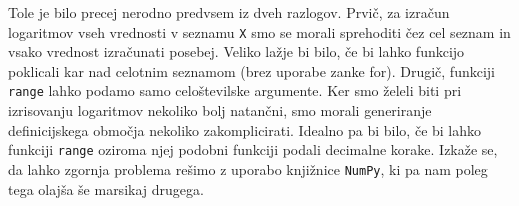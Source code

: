 Tole je bilo precej nerodno predvsem iz dveh razlogov. Prvič, za izračun logaritmov vseh vrednosti v seznamu \texttt{X} smo se morali sprehoditi čez cel seznam in vsako vrednost izračunati posebej. Veliko lažje bi bilo, če bi lahko funkcijo poklicali kar nad celotnim seznamom (brez uporabe zanke for). Drugič, funkciji \texttt{range} lahko podamo samo celoštevilske argumente. Ker smo želeli biti pri izrisovanju logaritmov nekoliko bolj natančni, smo morali generiranje definicijskega območja nekoliko zakomplicirati. Idealno pa bi bilo, če bi lahko funkciji \texttt{range} oziroma njej podobni funkciji podali decimalne korake. Izkaže se, da lahko zgornja problema rešimo z uporabo knjižnice \texttt{NumPy}, ki pa nam poleg tega olajša še marsikaj drugega.

